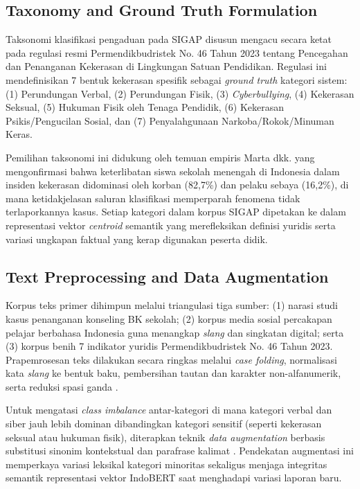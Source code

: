 \documentclass[conference]{IEEEtran}
\begin{document}
\subsection{Taxonomy and Ground Truth Formulation}

Taksonomi klasifikasi pengaduan pada SIGAP disusun mengacu secara ketat pada regulasi resmi Permendikbudristek No. 46 Tahun 2023 tentang Pencegahan dan Penanganan Kekerasan di Lingkungan Satuan Pendidikan. Regulasi ini mendefinisikan 7 bentuk kekerasan spesifik sebagai \textit{ground truth} kategori sistem: (1) Perundungan Verbal, (2) Perundungan Fisik, (3) \textit{Cyberbullying}, (4) Kekerasan Seksual, (5) Hukuman Fisik oleh Tenaga Pendidik, (6) Kekerasan Psikis/Pengucilan Sosial, dan (7) Penyalahgunaan Narkoba/Rokok/Minuman Keras.

Pemilihan taksonomi ini didukung oleh temuan empiris Marta dkk. \cite{marta2026} yang mengonfirmasi bahwa keterlibatan siswa sekolah menengah di Indonesia dalam insiden kekerasan didominasi oleh korban (82,7\%) dan pelaku sebaya (16,2\%), di mana ketidakjelasan saluran klasifikasi memperparah fenomena tidak terlaporkannya kasus. Setiap kategori dalam korpus SIGAP dipetakan ke dalam representasi vektor \textit{centroid} semantik yang merefleksikan definisi yuridis serta variasi ungkapan faktual yang kerap digunakan peserta didik.

\subsection{Text Preprocessing and Data Augmentation}

Korpus teks primer dihimpun melalui triangulasi tiga sumber: (1) narasi studi kasus penanganan konseling BK sekolah; (2) korpus media sosial percakapan pelajar berbahasa Indonesia guna menangkap \textit{slang} dan singkatan digital; serta (3) korpus benih 7 indikator yuridis Permendikbudristek No. 46 Tahun 2023. Prapemrosesan teks dilakukan secara ringkas melalui \textit{case folding}, normalisasi kata \textit{slang} ke bentuk baku, pembersihan tautan dan karakter non-alfanumerik, serta reduksi spasi ganda \cite{jazuli2025}.

Untuk mengatasi \textit{class imbalance} antar-kategori di mana kategori verbal dan siber jauh lebih dominan dibandingkan kategori sensitif (seperti kekerasan seksual atau hukuman fisik), diterapkan teknik \textit{data augmentation} berbasis substitusi sinonim kontekstual dan parafrase kalimat \cite{tang2023}. Pendekatan augmentasi ini memperkaya variasi leksikal kategori minoritas sekaligus menjaga integritas semantik representasi vektor IndoBERT saat menghadapi variasi laporan baru.
\end{document}
